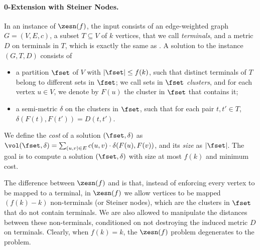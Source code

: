 \paragraph{0-Extension with Steiner Nodes.}
In an instance of $\zesn(f)$, the input consists of an edge-weighted graph $G=(V,E,c)$, a subset $T\subseteq V$ of $k$ vertices, that we call \emph{terminals}, and a metric $D$ on terminals in $T$, which is exactly the same as \ze.
A solution to the instance $(G,T,D)$ consists of 
\begin{itemize}
\item a partition $\fset$ of $V$ with $|\fset|\le f(k)$, such that distinct terminals of $T$ belong to different sets in $\fset$; we call sets in $\fset$ \emph{clusters}, and for each vertex $u\in V$, we denote by $F(u)$ the cluster in $\fset$ that contains it;
\item a semi-metric $\delta$ on the clusters in $\fset$, such that for each pair $t,t'\in T$, $\delta(F(t),F(t'))= D(t,t')$.
\end{itemize}
%
We define the \emph{cost} of a solution $(\fset,\delta)$ as $\vol(\fset,\delta)=\sum_{(u,v)\in E}c(u,v)\cdot\delta(F(u),F(v))$, and its \emph{size} as $|\fset|$.
The goal is to compute a solution $(\fset,\delta)$ with size at most $f(k)$ and minimum cost. 

The difference between $\zesn(f)$ and \ze is that, instead of enforcing every vertex to be mapped to a terminal, in $\zesn(f)$ we allow vertices to be mapped $(f(k)-k)$ non-terminals (or Steiner nodes), which are the clusters in $\fset$ that do not contain terminals. 
We are also allowed to manipulate the distances between these non-terminals, conditioned on not destroying the induced metric $D$ on terminals. Clearly, when $f(k)=k$, the $\zesn(f)$ problem degenerates to the \ze problem.



